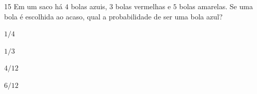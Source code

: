 \num{15} Em um saco há $4$ bolas azuis, $3$ bolas vermelhas e $5$ bolas amarelas.
Se uma bola é escolhida ao acaso, qual a probabilidade de ser uma bola
azul?

\begin{escolha}
\item
  $1/4$
\item
  $1/3$
\item
  $4/12$
\item
  $6/12$
\end{escolha}




